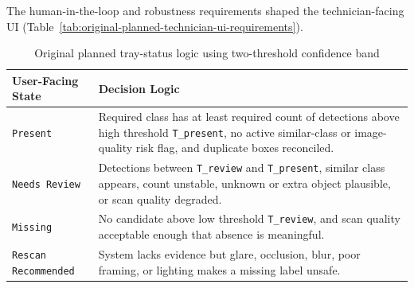 \documentclass[10pt,a4paper]{article}
\begin{document}
The human-in-the-loop and robustness requirements shaped the technician-facing
UI (Table~\ref{tab:original-planned-technician-ui-requirements}).

\begin{table}[H]
\centering
\caption{Original planned tray-status logic using two-threshold confidence band}
\label{tab:original-planned-tray-status-logic}
\small\renewcommand{\arraystretch}{1.2}\setlength{\tabcolsep}{4pt}
\begin{tabularx}{\textwidth}{|>{\raggedright\arraybackslash}X|>{\raggedright\arraybackslash}X|}
\hline
User-Facing State & Decision Logic \\
\hline
\texttt{Present} & Required class has at least required count of detections above high threshold \texttt{T\_present}, no active similar-class or image-quality risk flag, and duplicate boxes reconciled. \\
\hline
\texttt{Needs Review} & Detections between \texttt{T\_review} and \texttt{T\_present}, similar class appears, count unstable, unknown or extra object plausible, or scan quality degraded. \\
\hline
\texttt{Missing} & No candidate above low threshold \texttt{T\_review}, and scan quality acceptable enough that absence is meaningful. \\
\hline
\texttt{Rescan Recommended} & System lacks evidence but glare, occlusion, blur, poor framing, or lighting makes a missing label unsafe. \\
\hline
\end{tabularx}
\end{table}
\end{document}

